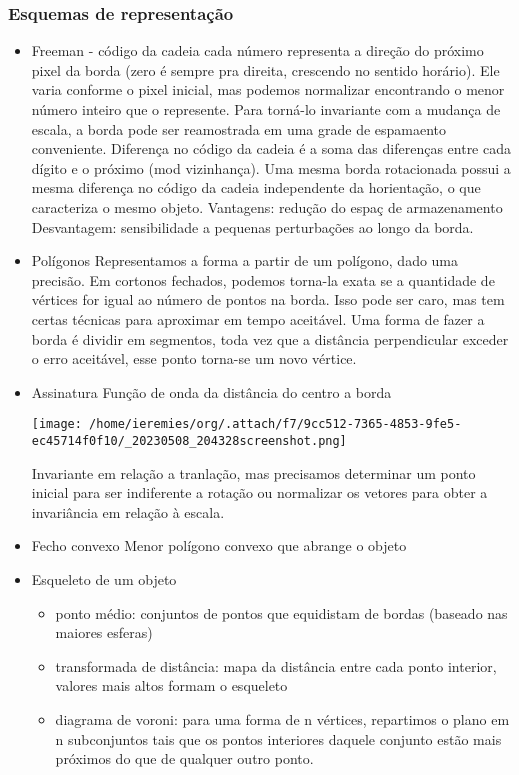 \documentclass[twocolumn, 10pt]{article}
\begin{document}
\subsubsection*{Esquemas de representação}
\label{sec:orga712d9d}
\begin{itemize}
\item Freeman - código da cadeia
\label{sec:org910d051}
cada número representa a direção do próximo pixel da borda (zero é sempre pra direita, crescendo no sentido horário).
Ele varia conforme o pixel inicial, mas podemos normalizar encontrando o menor número inteiro que o represente.
Para torná-lo invariante com a mudança de escala, a borda pode ser reamostrada em uma grade de espamaento conveniente.
Diferença no código da cadeia é a soma das diferenças entre cada dígito e o próximo (mod vizinhança).
Uma mesma borda rotacionada possui a mesma diferença no código da cadeia independente da horientação, o que caracteriza o mesmo objeto.
Vantagens: redução do espaç de armazenamento
Desvantagem: sensibilidade a pequenas perturbações ao longo da borda.
\item Polígonos
\label{sec:orge52c244}
Representamos a forma a partir de um polígono, dado uma precisão.
Em cortonos fechados, podemos torna-la exata se a quantidade de vértices for igual ao número de pontos na borda.
Isso pode ser caro, mas tem certas técnicas para aproximar em tempo aceitável.
Uma forma de fazer a borda é dividir em segmentos, toda vez que a distância perpendicular exceder o erro aceitável, esse ponto torna-se um novo vértice.
\item Assinatura
\label{sec:orgad030b4}
Função de onda da distância do centro a borda

\begin{center}
\texttt{[image: /home/ieremies/org/.attach/f7/9cc512-7365-4853-9fe5-ec45714f0f10/\_20230508\_204328screenshot.png]}
\end{center}
Invariante em relação a tranlação, mas precisamos determinar um ponto inicial para ser indiferente a rotação ou normalizar os vetores para obter a invariância em relação à escala.
\item Fecho convexo
\label{sec:orgdeb7990}
Menor polígono convexo que abrange o objeto
\item Esqueleto de um objeto
\label{sec:orgbac61c8}
\begin{itemize}
\item ponto médio: conjuntos de pontos que equidistam de bordas (baseado nas maiores esferas)
\item transformada de distância: mapa da distância entre cada ponto interior, valores mais altos formam o esqueleto
\item diagrama de voroni: para uma forma de n vértices, repartimos o plano em n subconjuntos tais que os pontos interiores daquele conjunto estão mais próximos do que de qualquer outro ponto.
\end{itemize}
\end{itemize}
\end{document}
